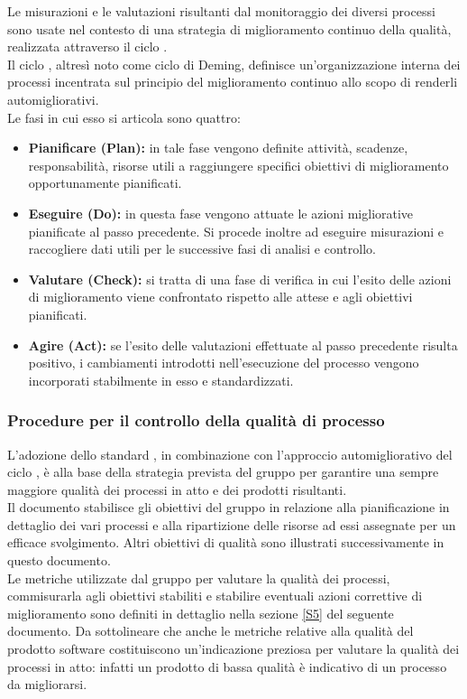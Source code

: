 	Le misurazioni e le valutazioni risultanti dal monitoraggio dei diversi processi sono usate nel contesto di una strategia di miglioramento continuo della qualità, realizzata attraverso il ciclo .
	\\Il ciclo , altresì noto come ciclo di Deming, definisce un'organizzazione interna dei processi incentrata sul principio del miglioramento continuo allo scopo di renderli automigliorativi.
	\\Le fasi in cui esso si articola sono quattro:
		\begin{itemize}
			\item \textbf{Pianificare (Plan):} in tale fase vengono definite attività, scadenze, responsabilità, risorse utili a raggiungere specifici obiettivi di miglioramento opportunamente pianificati.
			\item \textbf{Eseguire (Do):} in questa fase vengono attuate le azioni migliorative pianificate al passo precedente. Si procede inoltre ad eseguire misurazioni e raccogliere dati utili per le successive fasi di analisi e controllo.
			\item \textbf{Valutare (Check):} si tratta di una fase di verifica in cui l'esito delle azioni di miglioramento viene confrontato rispetto alle attese e agli obiettivi pianificati.
			\item \textbf{Agire (Act):} se l'esito delle valutazioni effettuate al passo precedente risulta positivo, i cambiamenti introdotti nell'esecuzione del processo vengono incorporati stabilmente in esso e standardizzati.
		\end{itemize}

		\subsubsection{Procedure per il controllo della qualità di processo}
		L'adozione dello standard , in combinazione con l'approccio automigliorativo del ciclo , è alla base della strategia prevista del gruppo per garantire una sempre maggiore qualità dei processi in atto e dei prodotti risultanti.
		\\Il documento \PdP{} stabilisce gli obiettivi del gruppo in relazione alla pianificazione in dettaglio dei vari processi e alla ripartizione delle risorse ad essi assegnate per un efficace svolgimento. Altri obiettivi di qualità sono illustrati successivamente in questo documento.
		\\Le metriche utilizzate dal gruppo per valutare la qualità dei processi, commisurarla agli obiettivi stabiliti e stabilire eventuali azioni correttive di miglioramento sono definiti in dettaglio nella sezione \ref{S5} del seguente documento. Da sottolineare che anche le metriche relative alla qualità del prodotto software costituiscono un'indicazione preziosa per valutare la qualità dei processi in atto: infatti un prodotto di bassa qualità è indicativo di un processo da migliorarsi.

